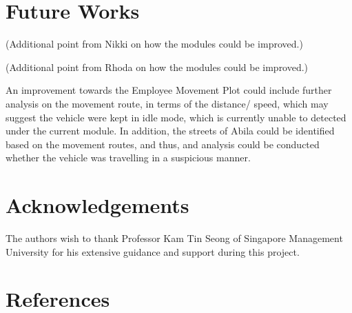 \documentclass{acm_proc_article-sp}
\begin{document}
\hypertarget{future-works}{%
\section{Future Works}\label{future-works}}

(Additional point from Nikki on how the modules could be improved.)

(Additional point from Rhoda on how the modules could be improved.)

An improvement towards the Employee Movement Plot could include further
analysis on the movement route, in terms of the distance/ speed, which
may suggest the vehicle were kept in idle mode, which is currently
unable to detected under the current module. In addition, the streets of
Abila could be identified based on the movement routes, and thus, and
analysis could be conducted whether the vehicle was travelling in a
suspicious manner.

\hypertarget{acknowledgements}{%
\section{Acknowledgements}\label{acknowledgements}}

The authors wish to thank Professor Kam Tin Seong of Singapore
Management University for his extensive guidance and support during this
project.

\hypertarget{references}{%
\section{References}\label{references}}
\end{document}
